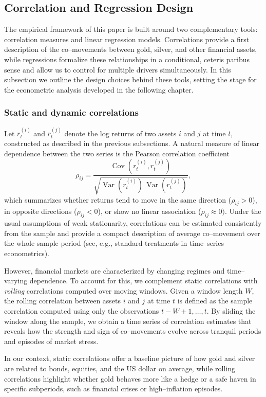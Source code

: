 \subsection{Correlation and Regression Design}

The empirical framework of this paper is built around two complementary tools: correlation
measures and linear regression models. Correlations provide a first description of the
co–movements between gold, silver, and other financial assets, while regressions formalize
these relationships in a conditional, ceteris paribus sense and allow us to control for
multiple drivers simultaneously. In this subsection we outline the design choices behind
these tools, setting the stage for the econometric analysis developed in the following
chapter.
\subsubsection{Static and dynamic correlations}

Let $r^{(i)}_t$ and $r^{(j)}_t$ denote the log returns of two assets $i$ and $j$ at time $t$,
constructed as described in the previous subsections. A natural measure of linear
dependence between the two series is the Pearson correlation coefficient
\[
\rho_{ij} = \frac{\operatorname{Cov}(r^{(i)}_t, r^{(j)}_t)}
{\sqrt{\operatorname{Var}(r^{(i)}_t)\,\operatorname{Var}(r^{(j)}_t)}},
\]
which summarizes whether returns tend to move in the same direction ($\rho_{ij} > 0$),
in opposite directions ($\rho_{ij} < 0$), or show no linear association ($\rho_{ij} \approx 0)$.
Under the usual assumptions of weak stationarity, correlations can be estimated consistently
from the sample and provide a compact description of average co–movement over the whole
sample period (see, e.g., standard treatments in time–series econometrics).

However, financial markets are characterized by changing regimes and time–varying
dependence. To account for this, we complement static correlations with \emph{rolling}
correlations computed over moving windows. Given a window length $W$, the rolling
correlation between assets $i$ and $j$ at time $t$ is defined as the sample correlation
computed using only the observations $t-W+1,\dots,t$. By sliding the window along the
sample, we obtain a time series of correlation estimates that reveals how the strength and
sign of co–movements evolve across tranquil periods and episodes of market stress.

In our context, static correlations offer a baseline picture of how gold and silver are
related to bonds, equities, and the US dollar on average, while rolling correlations
highlight whether gold behaves more like a hedge or a safe haven in specific subperiods,
such as financial crises or high–inflation episodes.

